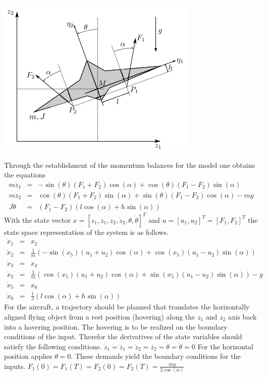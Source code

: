 \documentclass[letterpaper,10pt,english]{sphinxmanual}
\begin{document}
\includegraphics{aircraft.png}

Through the establishment of the momentum balances for the model one
obtains the equations
\begin{eqnarray*}
   m \ddot{z}_1 & = & - \sin(\theta)(F_1 + F_2)\cos(\alpha) + \cos(\theta)(F_1 - F_2)\sin(\alpha) \\
   m \ddot{z}_2 & = & \cos(\theta)(F_1 + F_2)\sin(\alpha) + \sin(\theta)(F_1 - F_2)\cos(\alpha) - mg \\
   J \ddot{\theta} & = & (F_1 - F_2)(l \cos(\alpha) + h \sin(\alpha))
\end{eqnarray*}
With the state vector \(x = [z_1, \dot{z}_1, z_2, \dot{z}_2, \theta, \dot{\theta}]^T\)
and \(u = [u_1, u_2]^T = [F_1, F_2]^T\) the state space
representation of the system is as follows.
\begin{eqnarray*}
   \dot{x}_1 & = & x_2 \\
   \dot{x}_2 & = & \frac{1}{m}(-\sin(x_5)(u_1 + u_2)\cos(\alpha) + \cos(x_5)(u_1 - u_2)\sin(\alpha)) \\
   \dot{x}_3 & = & x_4 \\
   \dot{x}_2 & = & \frac{1}{m}(\cos(x_5)(u_1 + u_2)\cos(\alpha) + \sin(x_5)(u_1 - u_2)\sin(\alpha)) - g  \\
   \dot{x}_5 & = & x_6 \\
   \dot{x}_6 & = & \frac{1}{J}(l \cos(\alpha) + h \sin(\alpha))
\end{eqnarray*}
For the aircraft, a trajectory should be planned that translates the
horizontally aligned flying object from a rest position (hovering) along
the \(z_1\) and \(z_2\) axis back into a hovering position.
The hovering is to be realized on the boundary conditions of the input.
Therefor the derivatives of the state variables should satisfy the
following conditions.
$ \dot{z}_1 = \ddot{z}_1 = \dot{z}_2 = \ddot{z_2} = \dot{\theta} = \ddot{\theta} = 0 $
For the horizontal position applies \(\theta = 0\). These demands
yield the boundary conditions for the inputs.
$ F_1(0) = F_1(T) = F_2(0) = F_2(T) = \frac{mg}{2 \cos(\alpha)} $
\end{document}
